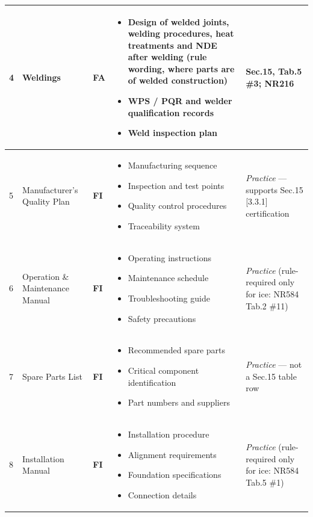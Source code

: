 \documentclass[11pt,a4paper]{report}
\newcommand{\fa}{\textbf{\textcolor{warningred}{FA}}}
\newcommand{\fic}{\textbf{\textcolor{bvgray}{FI}}}
\begin{document}
\begin{longtable}{|p{0.5cm}|p{5cm}|p{1.5cm}|p{5.5cm}|p{2cm}|}
4 & Weldings & \fa{} &
\begin{itemize}[leftmargin=*,nosep]
\item \textbf{Design of welded joints, welding procedures, heat treatments and NDE after welding} (rule wording, where parts are of welded construction)
\item WPS / PQR and welder qualification records
\item Weld inspection plan
\end{itemize} & Sec.15, Tab.5 \#3; NR216 \\
\hline

5 & Manufacturer's Quality Plan & \fic{} &
\begin{itemize}[leftmargin=*,nosep]
\item Manufacturing sequence
\item Inspection and test points
\item Quality control procedures
\item Traceability system
\end{itemize} & \emph{Practice} --- supports Sec.15 [3.3.1] certification \\
\hline

6 & Operation \& Maintenance Manual & \fic{} &
\begin{itemize}[leftmargin=*,nosep]
\item Operating instructions
\item Maintenance schedule
\item Troubleshooting guide
\item Safety precautions
\end{itemize} & \emph{Practice} (rule-required only for ice: NR584 Tab.2 \#11) \\
\hline

7 & Spare Parts List & \fic{} &
\begin{itemize}[leftmargin=*,nosep]
\item Recommended spare parts
\item Critical component identification
\item Part numbers and suppliers
\end{itemize} & \emph{Practice} --- not a Sec.15 table row \\
\hline

8 & Installation Manual & \fic{} & 
\begin{itemize}[leftmargin=*,nosep]
\item Installation procedure
\item Alignment requirements
\item Foundation specifications
\item Connection details
\end{itemize} & \emph{Practice} (rule-required only for ice: NR584 Tab.5 \#1) \\
\hline


\end{longtable}
\end{document}
